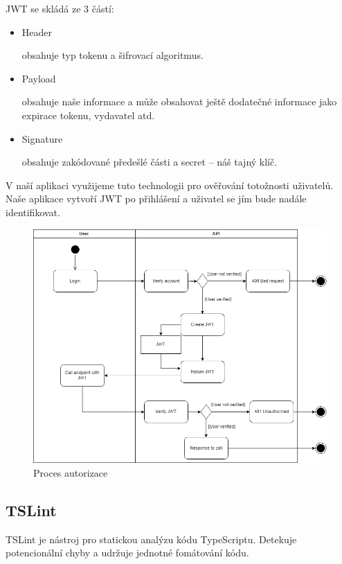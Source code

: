 \documentclass[thesis=B,czech]{FITthesis}[2012/06/26]
\begin{document}
            JWT se skládá ze 3 částí:
            \begin{itemize}
                \item Header
                    
                    obsahuje typ tokenu a šifrovací algoritmus.
                \item Payload
                    
                    obsahuje naše informace a může obsahovat ještě dodatečné informace jako expirace tokenu, vydavatel atd. %
                \item Signature
                    
                    obsahuje zakódované předešlé části a secret -- náš tajný klíč.
            \end{itemize}
             V naší aplikaci využijeme tuto technologii pro ověřování totožnosti uživatelů. Naše aplikace vytvoří JWT po přihlášení a uživatel se jím bude nadále identifikovat. \cite{jwt}
            \begin{figure}[h!]
                \includegraphics[width=\linewidth]{Process_of_authentication}
                \caption{Proces autorizace}
            \end{figure}
        \subsection{TSLint}
            TSLint je nástroj pro statickou analýzu kódu TypeScriptu. Detekuje potencionální chyby a udržuje jednotné fomátování kódu.\cite{tslint}
\end{document}
